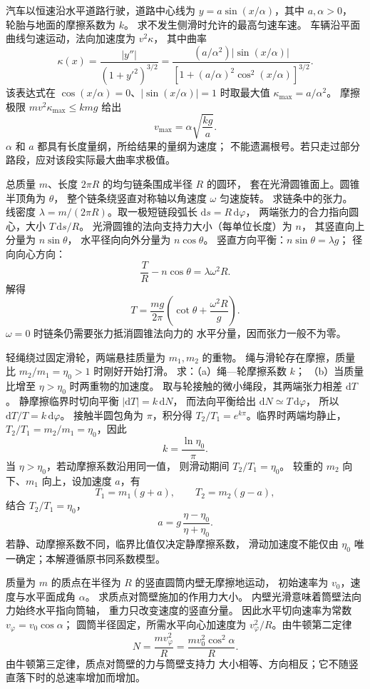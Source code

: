 汽车以恒速沿水平道路行驶，道路中心线为
$y=a\sin(x/\alpha)$，其中 $a,\alpha>0$，
轮胎与地面的摩擦系数为 $k$。
求不发生侧滑时允许的最高匀速车速。
\exsolution
车辆沿平面曲线匀速运动，法向加速度为 $v^2\kappa$，
其中曲率
\[
\kappa(x)=\frac{|y''|}{(1+y'^2)^{3/2}}
=\frac{(a/\alpha^2)|\sin(x/\alpha)|}
{[1+(a/\alpha)^2\cos^2(x/\alpha)]^{3/2}}.
\]
该表达式在 $\cos(x/\alpha)=0$、$|\sin(x/\alpha)|=1$
时取最大值 $\kappa_{\max}=a/\alpha^2$。
摩擦极限 $mv^2\kappa_{\max}\le kmg$ 给出
\[
\boxed{v_{\max}=\alpha\sqrt{\frac{kg}{a}}}.
\]
\excheck $\alpha$ 和 $a$ 都具有长度量纲，所给结果的量纲为速度；
不能遗漏根号。若只走过部分路段，应对该段实际最大曲率求极值。

总质量 $m$、长度 $2\pi R$ 的均匀链条围成半径 $R$ 的圆环，
套在光滑圆锥面上。圆锥半顶角为 $\theta$，
整个链条绕竖直对称轴以角速度 $\omega$ 匀速旋转。
求链条中的张力。
\exsolution
线密度 $\lambda=m/(2\pi R)$。取一极短链段弧长
$\mathrm ds=R\,\mathrm d\varphi$，
两端张力的合力指向圆心，大小
$T\,\mathrm ds/R$。
光滑圆锥的法向支持力大小（每单位长度）为 $n$，
其竖直向上分量为 $n\sin\theta$，
水平径向向外分量为 $n\cos\theta$。
竖直方向平衡：$n\sin\theta=\lambda g$；
径向向心方向：
\[
\frac TR-n\cos\theta=\lambda\omega^2R.
\]
解得
\[
\boxed{T=\frac{mg}{2\pi}
\left(\cot\theta+\frac{\omega^2R}{g}\right)}.
\]
\excheck $\omega=0$ 时链条仍需要张力抵消圆锥法向力的
水平分量，因而张力一般不为零。

轻绳绕过固定滑轮，两端悬挂质量为 $m_1,m_2$ 的重物。
绳与滑轮存在摩擦，质量比 $m_2/m_1=\eta_0>1$ 时刚好开始打滑。
求：（a）绳—轮摩擦系数 $k$；
（b）当质量比增至 $\eta>\eta_0$ 时两重物的加速度。
\exsolution
取与轮接触的微小绳段，其两端张力相差 $\mathrm dT$。
静摩擦临界时切向平衡
$|\mathrm dT|=k\,\mathrm dN$，
而法向平衡给出 $\mathrm dN\simeq T\,\mathrm d\varphi$，
所以 $\mathrm dT/T=k\,\mathrm d\varphi$。
接触半圆包角为 $\pi$，积分得
$T_2/T_1=e^{k\pi}$。临界时两端均静止，
$T_2/T_1=m_2/m_1=\eta_0$，因此
\[
\boxed{k=\frac{\ln\eta_0}{\pi}}.
\]
当 $\eta>\eta_0$，若动摩擦系数沿用同一值，
则滑动期间 $T_2/T_1=\eta_0$。
较重的 $m_2$ 向下、$m_1$ 向上，设加速度 $a$，有
\[
T_1=m_1(g+a),\qquad T_2=m_2(g-a),
\]
结合 $T_2/T_1=\eta_0$，
\[
\boxed{a=g\,\frac{\eta-\eta_0}{\eta+\eta_0}}.
\]
\excheck 若静、动摩擦系数不同，临界比值仅决定静摩擦系数，
滑动加速度不能仅由 $\eta_0$ 唯一确定；本解遵循原书同系数模型。

质量为 $m$ 的质点在半径为 $R$ 的竖直圆筒内壁无摩擦地运动，
初始速率为 $v_0$，速度与水平面成角 $\alpha$。
求质点对筒壁施加的作用力大小。
\exsolution
内壁光滑意味着筒壁法向力始终水平指向筒轴，
重力只改变速度的竖直分量。
因此水平切向速率为常数
$v_\varphi=v_0\cos\alpha$；
圆筒半径固定，所需水平向心加速度为
$v_\varphi^2/R$。由牛顿第二定律
\[
N=\frac{mv_\varphi^2}{R}
=\boxed{\frac{mv_0^2\cos^2\alpha}{R}}.
\]
\excheck 由牛顿第三定律，质点对筒壁的力与筒壁支持力
大小相等、方向相反；它不随竖直落下时的总速率增加而增加。

